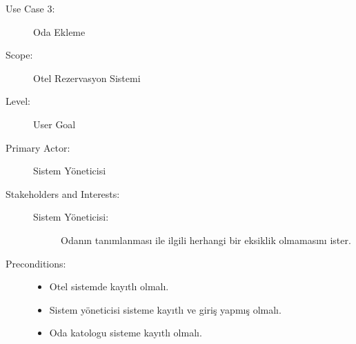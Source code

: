 \documentclass[12pt,a4paper]{report}
\begin{document}
\begin{description}
\item[Use Case 3:] Oda Ekleme \\
\item[Scope:] Otel Rezervasyon Sistemi
\item[Level:] User Goal
\item[Primary Actor:] Sistem Yöneticisi 
\item[Stakeholders and Interests:] \hspace{10 mm}
\begin{description} 
\item[Sistem Yöneticisi:] Odanın tanımlanması ile ilgili herhangi bir eksiklik olmamasını ister.
\end{description}
\item[Preconditions:] \hspace{10mm}
\begin{itemize}
\item Otel sistemde kayıtlı olmalı.
\item Sistem yöneticisi sisteme kayıtlı ve giriş yapmış olmalı.
\item Oda katologu sisteme kayıtlı olmalı.
\end{itemize}


\end{description}
\end{document}
